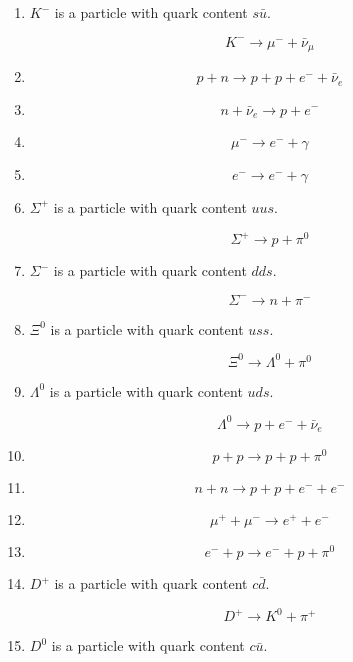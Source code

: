 \documentclass[12pt]{article}
\newcommand{\workspace}{
\vspace{1.2cm}
}
\begin{document}
\begin{enumerate}
\item
$K^-$ is a particle with quark content $s\bar{u}$.

\[
K^- \rightarrow \mu^- + \bar{\nu}_\mu
\]
\workspace

\item
\[
p + n \rightarrow p + p + e^- + \bar{\nu}_e
\]
\workspace

\item
\[
n + \bar{\nu}_e \rightarrow p + e^-
\]
\workspace

\item
\[
\mu^- \rightarrow e^- + \gamma
\]
\workspace

\item
\[
e^- \rightarrow e^- + \gamma
\]
\workspace

\item
$\Sigma^+$ is a particle with quark content $uus$.

\[
\Sigma^+ \rightarrow p + \pi^0
\]
\workspace

\item
$\Sigma^-$ is a particle with quark content $dds$.

\[
\Sigma^- \rightarrow n + \pi^-
\]
\workspace

\item
$\Xi^0$ is a particle with quark content $uss$.

\[
\Xi^0 \rightarrow \Lambda^0 + \pi^0
\]
\workspace

\item
$\Lambda^0$ is a particle with quark content $uds$.

\[
\Lambda^0 \rightarrow p + e^- + \bar{\nu}_e
\]
\workspace

\item
\[
p + p \rightarrow p + p + \pi^0
\]
\workspace

\item
\[
n + n \rightarrow p + p + e^- + e^-
\]
\workspace

\item
\[
\mu^+ + \mu^- \rightarrow e^+ + e^-
\]
\workspace

\item
\[
e^- + p \rightarrow e^- + p + \pi^0
\]
\workspace

\item
$D^+$ is a particle with quark content $c\bar{d}$.

\[
D^+ \rightarrow K^0 + \pi^+
\]
\workspace

\item
$D^0$ is a particle with quark content $c\bar{u}$.


\end{enumerate}
\end{document}
